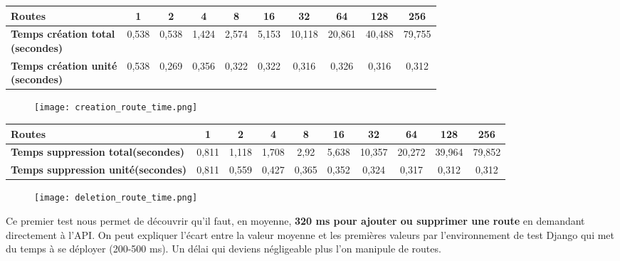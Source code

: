 \begin{footnotesize}
\small
\centerline{}
\begin{tabular}{ | M{2cm} || c | c | c | c | c |c | c | c | c | }
 \hline	
\textbf{Routes} & 1 & 2 & 4 & 8 & 16 & 32 & 64 & 128 & 256\\
\hline
\textbf{Temps création total\\(secondes)} & 0,538 & 0,538 & 1,424 & 2,574 & 5,153 & 10,118 & 20,861  & 40,488 & 79,755\\
\hline
\textbf{Temps création unité\\(secondes)} & 0,538 & 0,269 & 0,356 & 0,322 & 0,322 & 0,316 & 0,326 &	0,316 &	0,312\\
\hline  

\end{tabular}
\end{footnotesize}
\begin{figure}[H]
    \texttt{[image: creation\_route\_time.png]}
\end{figure}
\newpage
\begin{footnotesize}
\small
\centerline{}
\begin{tabular}{ | M{3cm} || c | c | c | c | c |c | c | c | c | }
 \hline	
\textbf{Routes} & 1 & 2 & 4 & 8 & 16 & 32 & 64 & 128 & 256\\
 \hline 
\textbf{Temps suppression total(secondes)} & 0,811 & 1,118 & 1,708 & 2,92 & 5,638 & 10,357 & 20,272 & 39,964 & 79,852\\
 \hline 
\textbf{Temps suppression unité(secondes)} & 0,811 & 0,559 & 0,427 & 0,365 & 0,352 & 0,324 & 0,317 & 0,312 & 0,312\\
 \hline  
 \end{tabular}
\end{footnotesize}

\begin{figure}[H]
    \texttt{[image: deletion\_route\_time.png]}
\end{figure}


Ce premier test nous permet de découvrir qu'il faut, en moyenne, \textbf{320 ms pour ajouter ou supprimer une route} en demandant directement à l'API.
On peut expliquer l'écart entre la valeur moyenne et les premières valeurs par l'environnement de test Django qui met du temps à se déployer (200-500 ms). Un délai qui deviens négligeable plus l'on manipule de routes.



